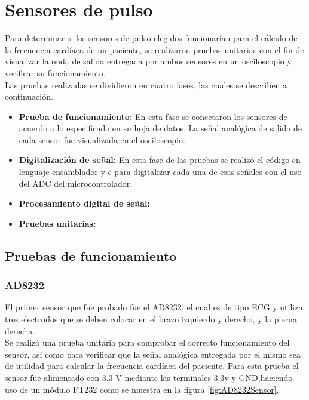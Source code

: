 
\section{Sensores de pulso}
Para determinar si los sensores de pulso elegidos funcionarían para el cálculo de la frecuencia cardíaca de un paciente, se realizaron pruebas unitarias con el fin de  visualizar la onda de salida entregada por ambos sensores en un osciloscopio y verificar su funcionamiento.\\

Las pruebas realizadas se dividieron en cuatro fases, las cuales se describen a continuación.


\begin{itemize}
	\item \textbf{Prueba de funcionamiento:} En esta fase se conectaron los sensores de acuerdo a lo especificado en su hoja de datos. La señal analógica de salida de cada sensor fue visualizada en el osciloscopio.
	\item \textbf{Digitalización de señal:} En esta fase de las pruebas se realizó el código en lenguaje ensamblador y c para digitalizar cada una de esas señales con el uso del ADC del microcontrolador.
	\item \textbf{Procesamiento digital de señal:}
	\item \textbf{Pruebas unitarias:}
\end{itemize}

\subsection{Pruebas de funcionamiento}
\subsubsection{AD8232}
El primer sensor que fue probado fue el AD8232, el cual es de tipo ECG y utiliza tres electrodos que se deben colocar en el brazo izquierdo y derecho, y la pierna derecha.\\

Se realizó una prueba unitaria para comprobar el correcto funcionamiento del sensor, así como para verificar que la señal analógica entregada por el mismo sea de utilidad para calcular la frecuencia cardíaca del paciente. Para esta prueba el sensor fue alimentado con 3.3 V mediante las terminales 3.3v y GND,haciendo uso de un módulo FT232 como se muestra en la figura \ref{fig:AD8232Sensor}.\\


